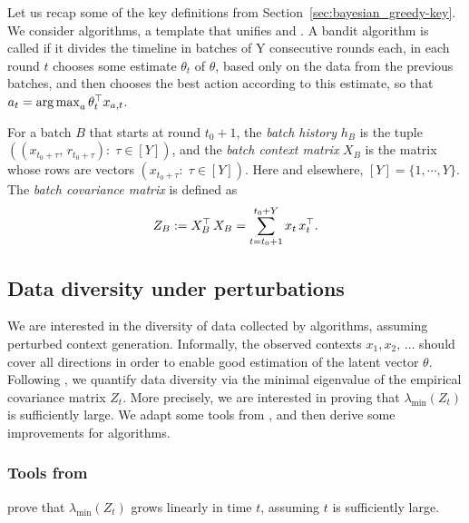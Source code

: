 Let us recap some of the key definitions from Section~\ref{sec:bayesian_greedy-key}. We consider \GreedyStyle algorithms, a template that unifies \BayesGreedy and \FreqGreedy. A bandit algorithm is called \emph{\GreedyStyle} if it divides the timeline in batches of Y consecutive rounds each, in each round $t$ chooses some estimate $\theta_t$ of $\theta$, based only on the data from the previous batches, and then chooses the best action according to this estimate, so that
 $a_t = \operatorname*{arg\,max}_a \theta_t^{\top} x_{a,t}$.

For a batch $B$ that starts at round $t_0+1$, the \emph{batch history} $h_B$ is the tuple
    $((x_{t_0+\tau},\,r_{t_0+\tau}):\; \tau\in [Y])$,
and the \emph{batch context matrix} $X_B$ is the matrix whose rows are vectors
    $(x_{t_0+\tau}:\; \tau\in [Y])$.
Here and elsewhere, $[Y] = \{1, \cdots, Y\}$. The \emph{batch covariance matrix} is defined as
\begin{align}\label{eq:ZB-defn}
Z_B := X_B^{\top}\, X_B = \sum_{t=t_0+1}^{t_0+Y} x_t\, x_t^{\top}.
\end{align}


\subsection{Data diversity under perturbations}
\label{app:pf_bg:diversity}

We are interested in the diversity of data collected by \GreedyStyle algorithms, assuming perturbed context generation. Informally, the observed contexts
    $x_1, x_2,\,\ldots $
should cover all directions in order to enable good estimation of the latent vector $\theta$. Following \citet{kannan2018smoothed}, we quantify data diversity via the minimal eigenvalue of the empirical covariance matrix $Z_t$. More precisely, we are interested in proving that $\lambda_{\min}(Z_t)$ is sufficiently large. We adapt some tools from \citet{kannan2018smoothed}, and then derive some improvements for \GreedyStyle algorithms.


\subsubsection{Tools from~\citet{kannan2018smoothed}}

\citet{kannan2018smoothed} prove that $\lambda_{\min}(Z_t)$ grows linearly in time $t$, assuming $t$ is sufficiently large.


